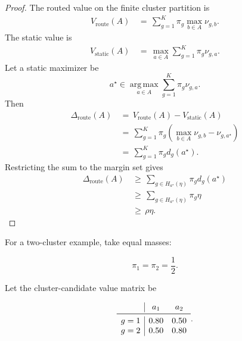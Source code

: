 \documentclass{article} %
\begin{document}
\begin{proof}
The routed value on the finite cluster partition is
\begin{align}
\label{eq:app-fifth-cluster-route}
V_{\mathrm{route}}(A)
&\,=\,
\sum_{g=1}^{K}
\pi_g
\max_{b\in A}\nu_{g,b}.
\end{align}
The static value is
\begin{align}
\label{eq:app-fifth-cluster-static}
V_{\mathrm{static}}(A)
&\,=\,
\max_{a\in A}
\sum_{g=1}^{K}\pi_g\nu_{g,a}.
\end{align}
Let a static maximizer be
\begin{equation}
\label{eq:app-fifth-static-maximizer}
a^\star
\in
\operatorname*{arg\,max}_{a\in A}
\sum_{g=1}^{K}\pi_g\nu_{g,a}.
\end{equation}
Then
\begin{align}
\label{eq:app-fifth-margin-proof-delta}
\Delta_{\mathrm{route}}(A)
&\,=\,
V_{\mathrm{route}}(A)-V_{\mathrm{static}}(A)
\\
&\,=\,
\sum_{g=1}^{K}
\pi_g
\left(
\max_{b\in A}\nu_{g,b}-\nu_{g,a^\star}
\right)
\\
&\,=\,
\sum_{g=1}^{K}\pi_g d_g(a^\star).
\end{align}
Restricting the sum to the margin set gives
\begin{align}
\label{eq:app-fifth-margin-proof-restrict}
\Delta_{\mathrm{route}}(A)
&\,\ge\,
\sum_{g\in H_{a^\star}(\eta)}
\pi_g d_g(a^\star)
\\
&\,\ge\,
\sum_{g\in H_{a^\star}(\eta)}
\pi_g\eta
\\
&\,\ge\,
\rho\eta.
\end{align}
\end{proof}

For a two-cluster example, take equal masses:

\begin{equation}
\label{eq:app-fifth-margin-example-mass}
\pi_1=\pi_2=\frac{1}{2}.
\end{equation}

Let the cluster-candidate value matrix be

\begin{equation}
\label{eq:app-fifth-margin-example-matrix}
\begin{array}{c|cc}
& a_1 & a_2\\
\midrule
g=1 & 0.80 & 0.50\\
g=2 & 0.50 & 0.80
\end{array}.
\end{equation}
\end{document}
